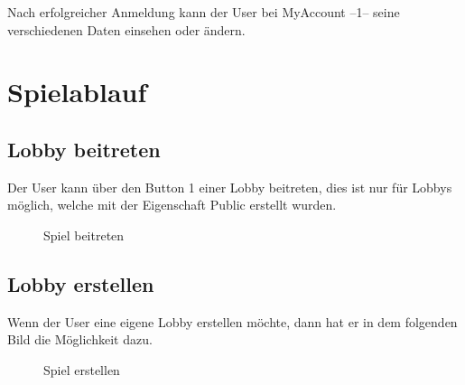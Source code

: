 \documentclass[11pt,ngerman]{article}
\begin{document}
	Nach erfolgreicher Anmeldung kann der User bei MyAccount --1-- seine verschiedenen Daten einsehen oder ändern. 
    
    \section{Spielablauf}
    
    
    \subsection{Lobby beitreten}
    
    Der User kann über den Button 1 einer Lobby beitreten, dies ist nur für Lobbys möglich, welche mit der Eigenschaft Public erstellt wurden.
    
    \begin{figure}[H]
    	\centering
    	\caption{Spiel beitreten}
    	\label{fig:Spiel_Beitreten}
    \end{figure}
    
    \subsection{Lobby erstellen}
    
    Wenn der User eine eigene Lobby erstellen möchte, dann hat er in dem folgenden Bild die Möglichkeit dazu.
    
	\begin{figure}[H]
		\centering
		\caption{Spiel erstellen}
		\label{fig:Spiel_Erstellen}
	\end{figure}
    
\end{document}
